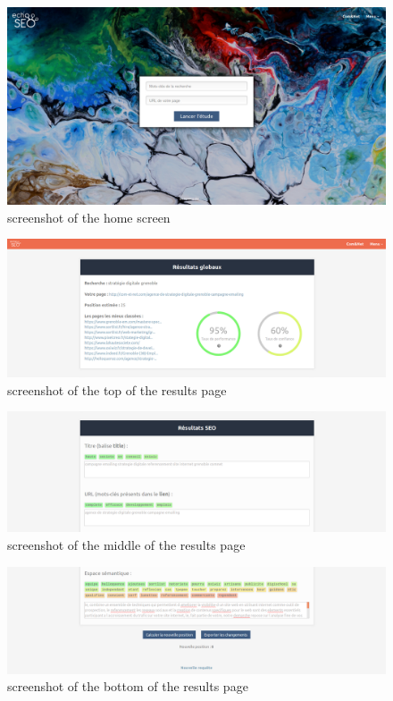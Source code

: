 \documentclass[12pt]{article}
\begin{document}
\begin{appendices}
\begin{figure}[p]
	\centering
	\includegraphics[scale=0.25]{ecranAccueil.jpg}
	\caption{screenshot of the home screen}
\end{figure}
\begin{figure}[p]
	\centering
	\includegraphics[scale=0.25]{hautDePage.png}
	\caption{screenshot of the top of the results page}
\end{figure}
\begin{figure}[p]
	\centering
	\includegraphics[scale=0.25]{milieuDePage.png}
	\caption{screenshot of the middle of the results page}
\end{figure}
\begin{figure}[p]
	\centering
	\includegraphics[scale=0.25]{basDePage.png}
	\caption{screenshot of the bottom of the results page}
\end{figure}


\end{appendices}
\end{document}

